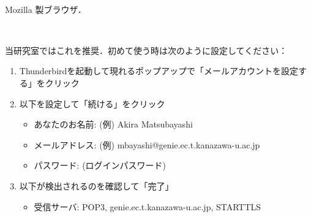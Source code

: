 \documentclass[main]{subfiles}
\begin{document}
\begin{description}
\begin{description}
    \end{description}

    \item[Web ブラウザ] 　

    
    \begin{description}

        \vspace{0.7em}

        \item[Firefox] Mozilla 製ブラウザ．
    
    \end{description}

    \item[メーラー] 　

    \begin{description}

        \vspace{0.7em}

        \item[Thunderbird] 当研究室ではこれを推奨．初めて使う時は次のように設定してください：

        \begin{enumerate}[itemsep=0.8em]
            
            \item Thunderbirdを起動して現れるポップアップで「メールアカウントを設定する」をクリック
            
            \item 以下を設定して「続ける」をクリック

                \begin{itemize}
                    
                    \item あなたのお名前: (例) Akira Matsubayashi

                    \item メールアドレス: (例) mbayashi@genie.ec.t.kanazawa-u.ac.jp

                    \item パスワード: (ログインパスワード)
                
                \end{itemize}

            \item 以下が検出されるのを確認して「完了」

                \begin{itemize}
                    
                    \item 受信サーバ: POP3, genie.ec.t.kanazawa-u.ac.jp, STARTTLS


\end{itemize}
\end{enumerate}
\end{description}
\end{description}
\end{document}
